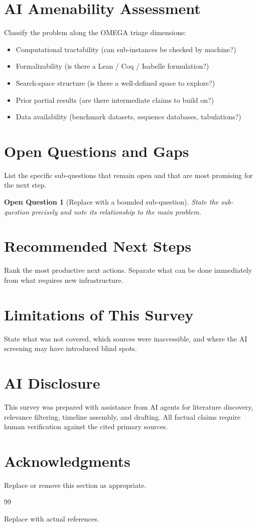 \documentclass[11pt]{article}
\newtheorem{openquestion}{Open Question}
\begin{document}
\section{AI Amenability Assessment}
Classify the problem along the OMEGA triage dimensions:
\begin{itemize}[leftmargin=1.5em]
  \item Computational tractability (can sub-instances be checked by machine?)
  \item Formalizability (is there a Lean / Coq / Isabelle formulation?)
  \item Search-space structure (is there a well-defined space to explore?)
  \item Prior partial results (are there intermediate claims to build on?)
  \item Data availability (benchmark datasets, sequence databases, tabulations?)
\end{itemize}

\section{Open Questions and Gaps}
List the specific sub-questions that remain open and that are most promising for the next step.

\begin{openquestion}[Replace with a bounded sub-question]
State the sub-question precisely and note its relationship to the main problem.
\end{openquestion}

\section{Recommended Next Steps}
Rank the most productive next actions.
Separate what can be done immediately from what requires new infrastructure.

\section{Limitations of This Survey}
State what was not covered, which sources were inaccessible, and where the AI screening
may have introduced blind spots.

\section*{AI Disclosure}
This survey was prepared with assistance from AI agents for literature discovery,
relevance filtering, timeline assembly, and drafting.
All factual claims require human verification against the cited primary sources.

\section*{Acknowledgments}
Replace or remove this section as appropriate.

\begin{thebibliography}{99}

Replace with actual references.

\end{thebibliography}
\end{document}
